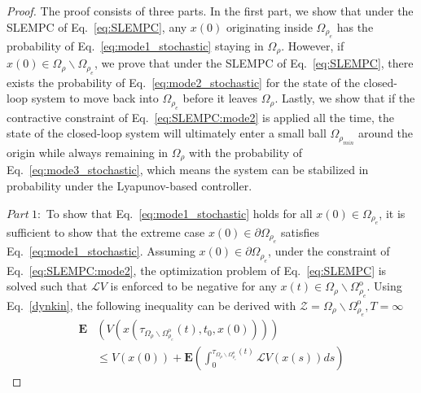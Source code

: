 \documentclass[letterpaper, 10pt, conference]{ieeeconf}
\begin{document}
\begin{proof}
The proof consists of three parts. In the first part, we show that under the SLEMPC of Eq.~\ref{eq:SLEMPC}, any $x(0)$ originating inside $\Omega_{\rho_e}$ has the probability of Eq.~\ref{eq:mode1_stochastic} staying in $\Omega_{\rho}$. However, if $x(0) \in \Omega_{\rho} \backslash \Omega_{\rho_e}$, we prove that under the SLEMPC of Eq.~\ref{eq:SLEMPC}, there exists the probability of Eq.~\ref{eq:mode2_stochastic} for the state of the closed-loop system to move back into $\Omega_{\rho_e}$ before it leaves $\Omega_{\rho}$. Lastly, we show that if the contractive constraint of Eq.~\ref{eq:SLEMPC:mode2} is applied all the time, the state of the closed-loop system will ultimately enter a small ball $\Omega_{\rho_{min}}$ around the origin while always remaining in $\Omega_{\rho}$ with the probability of Eq.~\ref{eq:mode3_stochastic}, which means the system can be stabilized in probability under the Lyapunov-based controller. 


$Part ~1:$ To show that Eq.~\ref{eq:mode1_stochastic} holds for all $x(0) \in \Omega_{\rho_e}$, it is sufficient to show that the extreme case $x(0) \in \partial \Omega_{\rho_e}$ satisfies Eq.~\ref{eq:mode1_stochastic}. Assuming $x(0) \in \partial \Omega_{\rho_e}$, under the constraint of Eq.~\ref{eq:SLEMPC:mode2}, the optimization problem of Eq.~\ref{eq:SLEMPC} is solved such that $\mathcal{L}V$ is enforced to be negative for any $x(t) \in \Omega_{\rho} \backslash \Omega_{\rho_e}^{\text{o}}$.
Using Eq.~\ref{dynkin}, the following inequality can be derived with $\mathcal{Z}=\Omega_\rho \backslash \Omega_{\rho_e}^{\text{o}}, T= \infty$
\begin{equation}\label{eq:Dynkin1}
\begin{aligned}
\mathbf{E}&(V(x(\tau_{\Omega_{\rho} \backslash \Omega_{\rho_e}^{\text{o}}}(t),t_0,x(0)))) \\
&\leq V(x(0)) +\mathbf{E}(\int_{0}^{\tau_{\Omega_\rho \backslash \Omega_{\rho_e}^{\text{o}}}(t)} \mathcal{L}V(x(s))ds )
\end{aligned}
\end{equation}




\end{proof}
\end{document}
